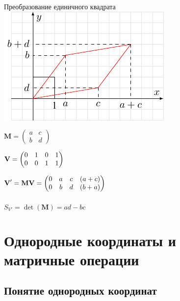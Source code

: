 \documentclass[10pt]{beamer}
\begin{document}
    \begin{frame}{Преобразование единичного квадрата}
    	{
    		\includegraphics{squere.pdf}
    	}
    	{
    		$\mathbf M =  
    		\begin{pmatrix}
    			a&c\\
    			b&d
    		\end{pmatrix}$
    		
    		$\textbf V = 
    		\begin{pmatrix}
    			0 & 1 & 0 & 1\\
    			0& 0 & 1 & 1
    		\end{pmatrix}$
    		
    		$
    		\textbf V'=\mathbf{MV}=
    		\begin{pmatrix}
    			0 & a & c & (a+c) \\
    			0 & b & d & (b+a)
    		\end{pmatrix}
    		$ \\~\\
    		$S_{V'} = \det(\mathbf M) = ad-bc$
    	}
    \end{frame}
    
    \section{Однородные координаты и матричные операции}
    
    \frame{\sectionpage}
    
    \subsection{Понятие однородных координат}
    
\end{document}
